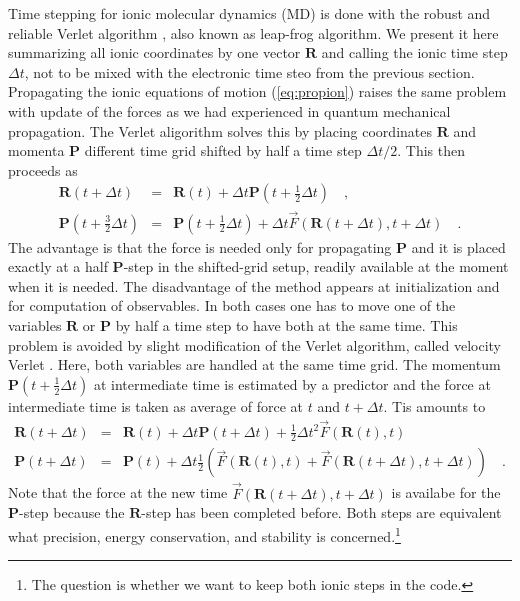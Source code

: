 \documentclass[final,1p]{elsarticle}
\newcommand{\PGRfoot}[1]{{\color{blue}\footnote{\color{blue} #1}}}
\begin{document}
Time stepping for ionic molecular dynamics (MD) is done with the
robust and reliable Verlet algorithm \cite{Ver67,Pre92}, also known as
leap-frog algorithm. We present it here summarizing all ionic
coordinates by one vector $\mathbf{R}$ and calling the
ionic time step $\Delta t$, not to be mixed with the electronic time
steo from the previous section.
Propagating the ionic equations of motion (\ref{eq:propion})
raises the same problem with update of the forces as we had
experienced in quantum mechanical propagation. The Verlet aligorithm
solves this by placing coordinates $\mathbf{R}$ and momenta
$\mathbf{P}$ different time grid shifted by half a time step
$\Delta t/2$. This then proceeds as
\begin{subequations}
\begin{eqnarray}
  \mathbf{R}(t\!+\!\Delta t)
  &=&
  \mathbf{R}(t) + \Delta
  t\mathbf{P}(t\!+\!{\textstyle\frac{1}{2}}\Delta t)
  \quad,
\label{eq:Verlet1}\\
  \mathbf{P}(t\!+\!{\textstyle\frac{3}{2}}\Delta t)
  &=&
  \mathbf{P}(t\!+\!{\textstyle\frac{1}{2}}\Delta t)
  + \Delta t\vec{F}(\mathbf{R}(t\!+\!\Delta t),t\!+\!\Delta t)
  \quad.
\end{eqnarray}
\end{subequations}
The advantage is that the force is needed only for propagating
$\mathbf{P}$ and it is placed exactly at a half $\mathbf{P}$-step in
the shifted-grid setup, readily available at the moment when it is
needed. The disadvantage of the method appears at initialization and
for computation of observables. In both cases one has to move one of
the variables $\mathbf{R}$ or $\mathbf{P}$ by half a time step to have
both at the same time.  This problem is avoided by slight modification
of the Verlet algorithm, called velocity Verlet \cite{Pre92}. Here,
both variables are handled at the same time grid.  The momentum
$\mathbf{P}(t\!+\!{\textstyle\frac{1}{2}}\Delta t)$ at intermediate
time is estimated by a predictor and the force at intermediate
time is taken as average of force at $t$ and $t\!+\!\Delta t$.
Tis amounts to
\begin{subequations}
\label{eq:velverlet}
\begin{eqnarray}
  \mathbf{R}(t\!+\!\Delta t)
  &=&
  \mathbf{R}(t)
  + \Delta t\mathbf{P}(t\!+\!\Delta t)
  + {\textstyle\frac{1}{2}}\Delta t^2\vec{F}(\mathbf{R}(t),t)
\nonumber \\
  \mathbf{P}(t\!+\!\Delta t)
  &=&
  \mathbf{P}(t)
  +
  \Delta t\frac{1}{2}
   \left(\vec{F}(\mathbf{R}(t),t)
          +\vec{F}(\mathbf{R}(t\!+\!\Delta t),t\!+\!\Delta t)\right)
  \quad.
\label{eq:velverlet2}
\end{eqnarray}
\end{subequations}
Note that the force at the new time
$\vec{F}(\mathbf{R}(t\!+\!\Delta t),t\!+\!\Delta t)$ is availabe for
the $\mathbf{P}$-step because the $\mathbf{R}$-step has been
completed before. Both steps are equivalent what precision, energy
conservation, and stability is concerned.\PGRfoot{The question is
  whether we want to keep both ionic steps in the code.}
\end{document}
